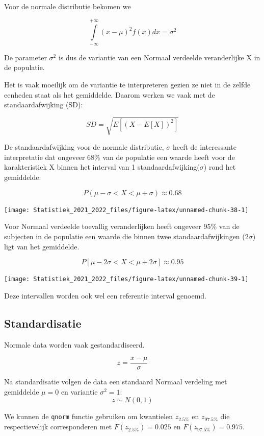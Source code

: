 \documentclass[
  12pt,dutch,coursenotes]{book}
\newcommand{\passthrough}[1]{#1}
\theoremstyle{definition}
\theoremstyle{definition}
\theoremstyle{definition}
\theoremstyle{definition}
\theoremstyle{remark}
\begin{document}
Voor de normale distributie bekomen we

\[\int \limits_{-\infty}^{+\infty} (x-\mu)^2 f(x) dx = \sigma^2\]

De parameter \(\sigma^2\) is dus de variantie van een Normaal verdeelde veranderlijke X in de populatie.

Het is vaak moeilijk om de variantie te interpreteren gezien ze niet in de zelfde eenheden staat als het gemiddelde. Daarom werken we vaak met de standaardafwijking (SD):

\[SD=\sqrt{E[(X-E[X])^2]}\]

De standaardafwijking voor de normale distributie, \(\sigma\) heeft de interessante interpretatie dat ongeveer 68\% van de populatie een waarde heeft voor de karakteristiek X binnen het interval van 1 standaardafwijking(\(\sigma\)) rond het gemiddelde:

\[P(\mu-\sigma < X < \mu + \sigma) \approx 0.68\]

\begin{center}\texttt{[image: Statistiek\_2021\_2022\_files/figure-latex/unnamed-chunk-38-1]} \end{center}

Voor Normaal verdeelde toevallig veranderlijken heeft ongeveer 95\% van de subjecten in de populatie een waarde die binnen twee standaardafwijkingen (\(2 \sigma\)) ligt van het gemiddelde.

\[P[\mu - 2 \sigma < X < \mu + 2 \sigma]\approx 0.95\]

\begin{center}\texttt{[image: Statistiek\_2021\_2022\_files/figure-latex/unnamed-chunk-39-1]} \end{center}

Deze intervallen worden ook wel een referentie interval genoemd.

\hypertarget{standardisatie}{%
\subsection{Standardisatie}\label{standardisatie}}

Normale data worden vaak gestandardiseerd.

\[z=\frac{x-\mu}{\sigma}\]

Na standardisatie volgen de data een standaard Normaal verdeling met gemiddelde \(\mu=0\) en variantie \(\sigma^2=1\):
\[z \sim N(0,1)\]

We kunnen de \passthrough{\lstinline!qnorm!} functie gebruiken om kwantielen \(z_{2.5\%}\) en \(z_{97.5\%}\) die respectievelijk corresponderen met \(F(z_{2.5\%})=0.025\) en \(F(z_{97.5\%})=0.975\).
\end{document}
